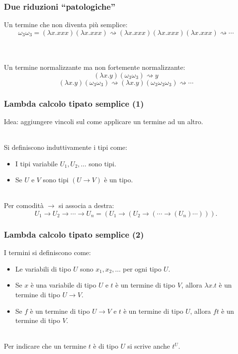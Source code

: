 \documentclass{beamer}
\renewcommand{\l}{\lambda}
\newcommand{\conv}{\rightsquigarrow}
\newcommand{\ar}{\rightarrow}
\begin{document}
\begin{frame}
    \frametitle{Due riduzioni ``patologiche''}
    Un termine che non diventa pi\`u semplice:
    \[
        \omega_3\omega_3 = (\l x. xxx)(\l x. xxx) \conv (\l x. xxx)(\l x.
        xxx)(\l x. xxx) \conv \cdots
    \]
    \\~\
    
    Un termine normalizzante ma non fortemente normalizzante:
    \[
        (\l x. y)(\omega_3\omega_3) \conv y
    \]
    \[
        (\l x. y)(\omega_3\omega_3) \conv (\l x. y)(\omega_3\omega_3\omega_3)
        \conv \cdots
    \]
\end{frame}

\begin{frame}
    \frametitle{Lambda calcolo tipato semplice (1)}
    Idea: aggiungere vincoli sul come applicare un termine ad un altro.
    \\~\
    
    Si definiscono induttivamente i tipi come:
    \begin{itemize}
        \item I tipi variabile $U_1, U_2, \dots$ sono tipi.
        \item Se $U$ e $V$ sono tipi $(U\ar V)$ \`e un tipo.
    \\~\
    \end{itemize}

    Per comodit\`a $\ar$ si associa a destra:
    \[
        U_1\ar U_2\ar \cdots \ar U_n = (U_1 \ar ( U_2 \ar ( \cdots \ar (U_n)
        \cdots ))).
    \]
\end{frame}


\begin{frame}
    \frametitle{Lambda calcolo tipato semplice (2)}
    
    I termini si definiscono come:
    \begin{itemize}
        \item Le variabili di tipo $U$ sono $x_1, x_2, \dots$ per ogni tipo $U$.
        \item Se $x$ \`e una variabile di tipo $U$ e $t$ \`e un termine di tipo
            $V$, allora $\l x. t$ \`e un termine di tipo $U\ar V$.
        \item Se $f$ \`e un termine di tipo $U\ar V$ e $t$ \`e un termine di
            tipo $U$, allora $ft$ \`e un termine di tipo $V$.
    \\~\
    \end{itemize}

    Per indicare che un termine $t$ \`e di tipo $U$ si scrive anche $t^U$.
\end{frame}
\end{document}
